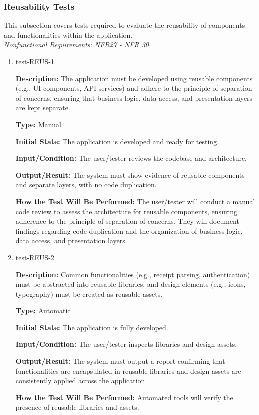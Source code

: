 \documentclass[12pt, titlepage]{article}
\begin{document}
\subsubsection{Reusability Tests}

This subsection covers tests required to evaluate the reusability of components and functionalities within the application. \\
\textit{Nonfunctional Requirements: NFR27 - NFR 30}

\begin{enumerate}

\item{test-REUS-1\\}

\textbf{Description:} The application must be developed using reusable components (e.g., UI components, API services) and adhere to the principle of separation of concerns, ensuring that business logic, data access, and presentation layers are kept separate.

\textbf{Type:} Manual
					
\textbf{Initial State:} The application is developed and ready for testing.
					
\textbf{Input/Condition:} The user/tester reviews the codebase and architecture.
					
\textbf{Output/Result:} The system must show evidence of reusable components and separate layers, with no code duplication.
					
\textbf{How the Test Will Be Performed:} The user/tester will conduct a manual code review to assess the architecture for reusable components, ensuring adherence to the principle of separation of concerns. They will document findings regarding code duplication and the organization of business logic, data access, and presentation layers.

\item{test-REUS-2\\}

\textbf{Description:} Common functionalities (e.g., receipt parsing, authentication) must be abstracted into reusable libraries, and design elements (e.g., icons, typography) must be created as reusable assets.

\textbf{Type:} Automatic
					
\textbf{Initial State:} The application is fully developed.
					
\textbf{Input/Condition:} The user/tester inspects libraries and design assets.
					
\textbf{Output/Result:} The system must output a report confirming that functionalities are encapsulated in reusable libraries and design assets are consistently applied across the application.
					
\textbf{How the Test Will Be Performed:} Automated tools will verify the presence of reusable libraries and assets.

\end{enumerate}
\end{document}
